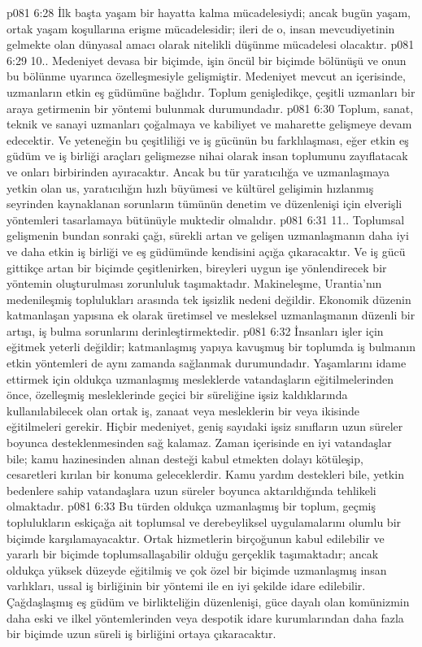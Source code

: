 \vs p081 6:28 İlk başta yaşam bir hayatta kalma mücadelesiydi; ancak bugün yaşam, ortak yaşam koşullarına erişme mücadelesidir; ileri de o, insan mevcudiyetinin gelmekte olan dünyasal amacı olarak nitelikli düşünme mücadelesi olacaktır.
\vs p081 6:29 10.\bibnobreakspace {}. Medeniyet devasa bir biçimde, işin öncül bir biçimde bölünüşü ve onun bu bölünme uyarınca özelleşmesiyle gelişmiştir. Medeniyet mevcut an içerisinde, uzmanların etkin eş güdümüne bağlıdır. Toplum genişledikçe, çeşitli uzmanları bir araya getirmenin bir yöntemi bulunmak durumundadır.
\vs p081 6:30 Toplum, sanat, teknik ve sanayi uzmanları çoğalmaya ve kabiliyet ve maharette gelişmeye devam edecektir. Ve yeteneğin bu çeşitliliği ve iş gücünün bu farklılaşması, eğer etkin eş güdüm ve iş birliği araçları gelişmezse nihai olarak insan toplumunu zayıflatacak ve onları birbirinden ayıracaktır. Ancak bu tür yaratıcılığa ve uzmanlaşmaya yetkin olan us, yaratıcılığın hızlı büyümesi ve kültürel gelişimin hızlanmış seyrinden kaynaklanan sorunların tümünün denetim ve düzenlenişi için elverişli yöntemleri tasarlamaya bütünüyle muktedir olmalıdır.
\vs p081 6:31 11.. Toplumsal gelişmenin bundan sonraki çağı, sürekli artan ve gelişen uzmanlaşmanın daha iyi ve daha etkin iş birliği ve eş güdümünde kendisini açığa çıkaracaktır. Ve iş gücü gittikçe artan bir biçimde çeşitlenirken, bireyleri uygun işe yönlendirecek bir yöntemin oluşturulması zorunluluk taşımaktadır. Makineleşme, Urantia’nın medenileşmiş toplulukları arasında tek işsizlik nedeni değildir. Ekonomik düzenin katmanlaşan yapısına ek olarak üretimsel ve mesleksel uzmanlaşmanın düzenli bir artışı, iş bulma sorunlarını derinleştirmektedir.
\vs p081 6:32 İnsanları işler için eğitmek yeterli değildir; katmanlaşmış yapıya kavuşmuş bir toplumda iş bulmanın etkin yöntemleri de aynı zamanda sağlanmak durumundadır. Yaşamlarını idame ettirmek için oldukça uzmanlaşmış mesleklerde vatandaşların eğitilmelerinden önce, özelleşmiş mesleklerinde geçici bir süreliğine işsiz kaldıklarında kullanılabilecek olan ortak iş, zanaat veya mesleklerin bir veya ikisinde eğitilmeleri gerekir. Hiçbir medeniyet, geniş sayıdaki işsiz sınıfların uzun süreler boyunca desteklenmesinden sağ kalamaz. Zaman içerisinde en iyi vatandaşlar bile; kamu hazinesinden alınan desteği kabul etmekten dolayı kötüleşip, cesaretleri kırılan bir konuma geleceklerdir. Kamu yardım destekleri bile, yetkin bedenlere sahip vatandaşlara uzun süreler boyunca aktarıldığında tehlikeli olmaktadır.
\vs p081 6:33 Bu türden oldukça uzmanlaşmış bir toplum, geçmiş toplulukların eskiçağa ait toplumsal ve derebeyliksel uygulamalarını olumlu bir biçimde karşılamayacaktır. Ortak hizmetlerin birçoğunun kabul edilebilir ve yararlı bir biçimde toplumsallaşabilir olduğu gerçeklik taşımaktadır; ancak oldukça yüksek düzeyde eğitilmiş ve çok özel bir biçimde uzmanlaşmış insan varlıkları, ussal iş birliğinin bir yöntemi ile en iyi şekilde idare edilebilir. Çağdaşlaşmış eş güdüm ve birlikteliğin düzenlenişi, güce dayalı olan komünizmin daha eski ve ilkel yöntemlerinden veya despotik idare kurumlarından daha fazla bir biçimde uzun süreli iş birliğini ortaya çıkaracaktır.
